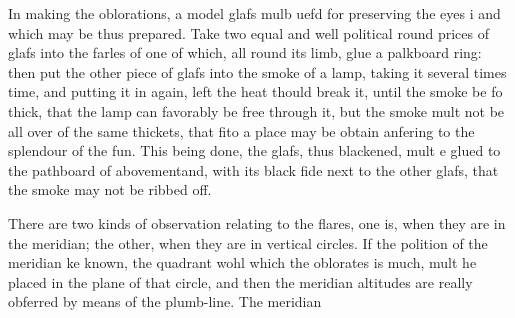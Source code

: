 \documentclass{article}
\begin{document}
In making the oblorations, a model glafs mulb uefd for preserving the eyes i and which may be thus prepared. Take two equal and well political round prices of glafs into the farles of one of which, all round its limb, glue a palkboard ring: then put the other piece of glafs into the smoke of a lamp, taking it several times time, and putting it in again, left the heat thould break it, until the smoke be fo thick, that the lamp can favorably be free through it, but the smoke mult not be all over of the same thickets, that fito a place may be obtain anfering to the splendour of the fun. This being done, the glafs, thus blackened, mult e glued to the pathboard of abovementand, with its black fide next to the other glafs, that the smoke may not be ribbed off.

There are two kinds of observation relating to the flares, one is, when they are in the meridian; the other, when they are in vertical circles. If the polition of the meridian ke known, the quadrant wohl which the oblorates is much, mult he placed in the plane of that circle, and then the meridian altitudes are really obferred by means of the plumb-line. The meridian
\end{document}
